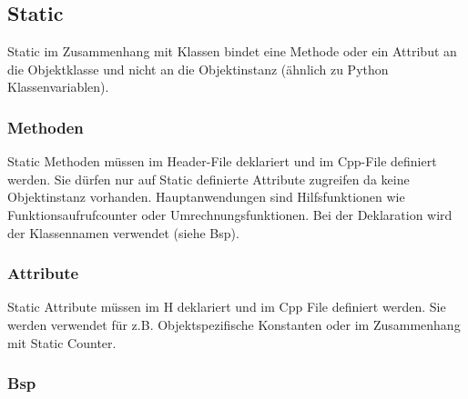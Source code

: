 

\subsection{Static} 

Static im Zusammenhang mit Klassen bindet eine Methode oder ein Attribut an die Objektklasse und nicht an die Objektinstanz (ähnlich zu Python Klassenvariablen).


\subsubsection{Methoden}

Static Methoden müssen im Header-File deklariert und im Cpp-File definiert werden. 
Sie dürfen nur auf Static definierte Attribute zugreifen da keine Objektinstanz vorhanden. 
Hauptanwendungen sind Hilfsfunktionen wie Funktionsaufrufcounter oder Umrechnungsfunktionen. 
Bei der Deklaration wird der Klassennamen verwendet (siehe Bsp). 

\subsubsection{Attribute}

Static Attribute müssen im H deklariert und im Cpp File definiert werden. 
Sie werden verwendet für z.B. Objektspezifische Konstanten oder im Zusammenhang mit Static Counter. 

\subsubsection{Bsp}


